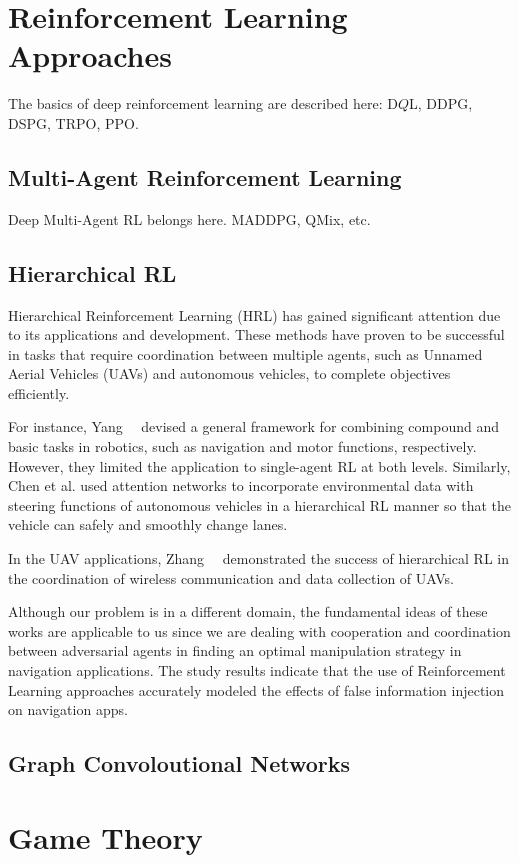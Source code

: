\section{Reinforcement Learning Approaches}

The basics of deep reinforcement learning are described here: D$Q$L, DDPG, DSPG, TRPO, PPO.

\subsection{Multi-Agent Reinforcement Learning}

Deep Multi-Agent RL belongs here. MADDPG, QMix, etc.

\subsection{Hierarchical RL}

Hierarchical Reinforcement Learning (HRL) has gained significant attention due to its applications and development. These methods have proven to be successful in tasks that require coordination between multiple agents, such as Unnamed Aerial Vehicles (UAVs) and autonomous vehicles, to complete objectives efficiently.

For instance, Yang~\ea~\cite{yang2018hierarchical} devised a general framework for combining compound and basic tasks in robotics, such as navigation and motor functions, respectively. However, they limited the application to single-agent RL at both levels. Similarly, Chen et al. used attention networks to incorporate environmental data with steering functions of autonomous vehicles in a hierarchical RL manner so that the vehicle can safely and smoothly change lanes.

In the UAV applications, Zhang~\ea~\cite{zhang2020hierarchical} demonstrated the success of hierarchical RL in the coordination of wireless communication and data collection of UAVs.

Although our problem is in a different domain, the fundamental ideas of these works are applicable to us since we are dealing with cooperation and coordination between adversarial agents in finding an optimal manipulation strategy in navigation applications. The study results indicate that the use of Reinforcement Learning approaches accurately modeled the effects of false information injection on navigation apps.

\subsection{Graph Convoloutional Networks}

\section{Game Theory}